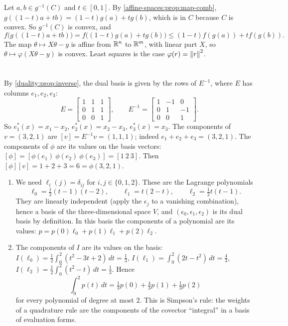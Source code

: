 Let $a, b\in g^{-1}(C)$ and $t\in[0, 1]$. By
\cref{affine-spaces:prop:map-comb},
$g((1 - t)a + tb) = (1 - t)g(a) + tg(b)$, which is in $C$ because $C$ is
convex. So $g^{-1}(C)$ is convex, and
\[
  f\bigl(g((1 - t)a + tb)\bigr) = f\bigl((1 - t)g(a) + tg(b)\bigr)
  \leq(1 - t)f(g(a)) + tf(g(b)) .
\]
The map $\theta\mapsto X\theta - y$ is affine from $\mathbb{R}^n$ to $\mathbb{R}^m$, with
linear part $X$, so $\theta\mapsto\varphi(X\theta - y)$ is convex. Least
squares is the case $\varphi(r) = \left\|r\right\|^2$.

\section{}

By \cref{duality:prop:inverse}, the dual basis is given by the rows of
$E^{-1}$, where $E$ has columns $e_1, e_2, e_3$:
\[
  E = \begin{bmatrix}1 & 1 & 1\\0 & 1 & 1\\0 & 0 & 1\end{bmatrix},
  \qquad
  E^{-1} = \begin{bmatrix}1 & -1 & 0\\0 & 1 & -1\\0 & 0 & 1\end{bmatrix}.
\]
So $e_1^*(x) = x_1 - x_2$, $e_2^*(x) = x_2 - x_3$, $e_3^*(x) = x_3$. The
components of $v = (3, 2, 1)$ are $[v] = E^{-1}v = (1, 1, 1)$; indeed
$e_1 + e_2 + e_3 = (3, 2, 1)$. The components of $\phi$ are its values on
the basis vectors: $[\phi] = [\phi(e_1)\ \phi(e_2)\ \phi(e_3)]
= [1\ 2\ 3]$. Then $[\phi][v] = 1 + 2 + 3 = 6 = \phi(3, 2, 1)$.

\begin{enumerate}[nosep]
  \item We need $\ell_i(j) = \delta_{ij}$ for $i, j\in\{0, 1, 2\}$. These
        are the Lagrange polynomials
        \[
          \ell_0 = \tfrac12(t - 1)(t - 2),\qquad
          \ell_1 = t(2 - t),\qquad
          \ell_2 = \tfrac12t(t - 1) .
        \]
        They are linearly independent (apply the $\epsilon_j$ to a
        vanishing combination), hence a basis of the three-dimensional
        space $V$, and $(\epsilon_0, \epsilon_1, \epsilon_2)$ is its dual
        basis by definition. In this basis the components of a polynomial
        are its values: $p = p(0)\ell_0 + p(1)\ell_1 + p(2)\ell_2$.
  \item The components of $I$ are its values on the basis:
        $I(\ell_0) = \frac12\int_0^2(t^2 - 3t + 2)\,dt = \frac13$,
        $I(\ell_1) = \int_0^2(2t - t^2)\,dt = \frac43$,
        $I(\ell_2) = \frac12\int_0^2(t^2 - t)\,dt = \frac13$. Hence
        \[
          \int_0^2p(t)\,dt = \tfrac13p(0) + \tfrac43p(1) + \tfrac13p(2)
        \]
        for every polynomial of degree at most $2$. This is Simpson's
        rule: the weights of a quadrature rule are the components of the
        covector ``integral'' in a basis of evaluation forms.
\end{enumerate}

